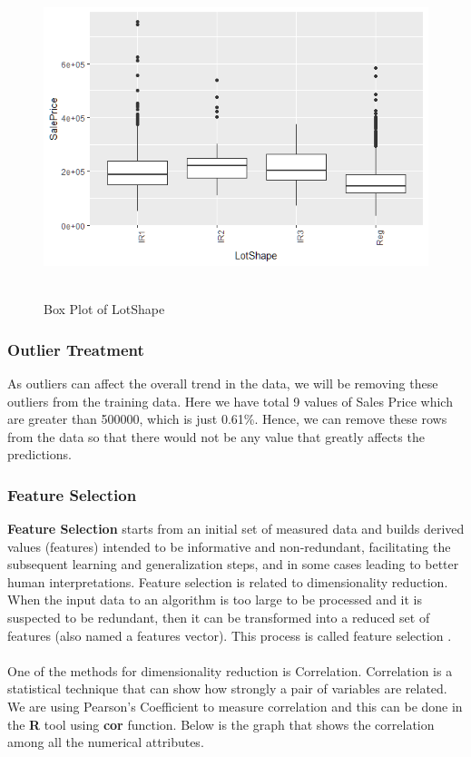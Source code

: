 \documentclass[fleqn,10pt]{SelfArx} %
\begin{document}
\begin{figure}[h!]\centering
\includegraphics[scale=0.4]{Boxplot4_Lotshape}
\\ \caption{\\ Box Plot of LotShape}
\end{figure}

\subsubsection{Outlier Treatment}
As outliers can affect the overall trend in the data, we will be removing these outliers from the training data. Here we have total 9 values of Sales Price which are greater than 500000, which is just 0.61\%. Hence, we can remove these rows from the data so that there would not be any value that greatly affects the predictions.

\subsubsection{Feature Selection}
\textbf{Feature Selection} starts from an initial set of measured data and builds derived values (features) intended to be informative and non-redundant, facilitating the subsequent learning and generalization steps, and in some cases leading to better human interpretations. Feature selection is related to dimensionality reduction.
When the input data to an algorithm is too large to be processed and it is suspected to be redundant, then it can be transformed into a reduced set of features (also named a features vector). This process is called feature selection \cite{REF:5}.
\\ \\One of the methods for dimensionality reduction is Correlation. Correlation is a statistical technique that can show how strongly a pair of variables are related.
\\ We are using Pearson's Coefficient to measure correlation and this can be done in the \textbf{R} tool using \textbf{cor} function. Below is the graph that shows the correlation among all the numerical attributes.
\end{document}
